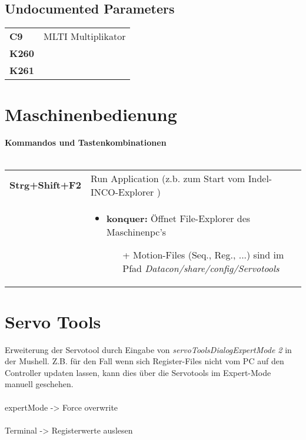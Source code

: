 	\subsection{Undocumented Parameters}
		\begin{tabular}{l|p{14cm}}
			\rowcolor{gray!10!white}
			\textbf{C9} & MLTI Multiplikator \\ \rowcolor{gray!10!white}	
			\textbf{K260} &  \\	
			\textbf{K261} &  \\	
		\end{tabular}
\section{Maschinenbedienung}
\textbf{Kommandos und Tastenkombinationen\\\\}
\begin{tabular}{l|p{14cm}}
	\rowcolor{gray!10!white}
	\textbf{Strg+Shift+F2} & Run Application (z.b. zum Start vom Indel-INCO-Explorer )\\
	\rowcolor{gray!10!white}
	& \begin{itemize}
		\item \textbf{konquer:} Öffnet File-Explorer des Maschinenpc's
		\begin{itemize}
			\item[+] Motion-Files (Seq., Reg., ...) sind im Pfad \textit{Datacon/share/config/Servotools}
		\end{itemize}	
	\end{itemize}	
\end{tabular}

\section{Servo Tools}
	Erweiterung der Servotool durch Eingabe von \textit{servoToolsDialogExpertMode 2} in der Mushell. Z.B. für den Fall wenn sich Register-Files nicht vom PC auf den Controller updaten lassen, kann dies über die Servotools im Expert-Mode manuell geschehen.\\\\
	
	expertMode -> Force overwrite\\\\
	
	Terminal -> Registerwerte auslesen

